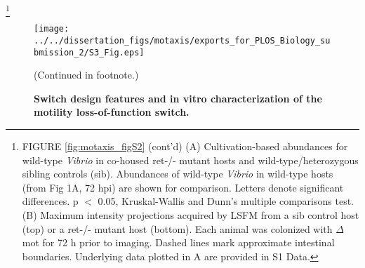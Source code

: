{{{{{{{{{\let\thefootnote\relax\footnote{FIGURE \ref{fig:motaxis_figS2} (cont'd) (A) Cultivation-based abundances for wild-type \textit{Vibrio} in co-housed ret-/- mutant hosts and wild-type/heterozygous sibling controls (sib). Abundances of wild-type \textit{Vibrio} in wild-type hosts (from Fig 1A, 72 hpi) are shown for comparison. Letters denote significant differences. p $ < $ 0.05, Kruskal-Wallis and Dunn's multiple comparisons test. (B) Maximum intensity projections acquired by LSFM from a sib control host (top) or a ret-/- mutant host (bottom). Each animal was colonized with $\Delta$mot for 72 h prior to imaging. Dashed lines mark approximate intestinal boundaries. Underlying data plotted in A are provided in S1 Data.}

\newpage

\begin{figure}%
	\centerline{
		\texttt{[image: ../../dissertation\_figs/motaxis/exports\_for\_PLOS\_Biology\_submission\_2/S3\_Fig.eps]}}
	\caption{\textbf{Switch design features and in vitro characterization of the motility loss-of-function switch.}}{(Continued in footnote.)}
	\label{fig:motaxis_figS3}
\end{figure}
		
}}}}}}}}}
